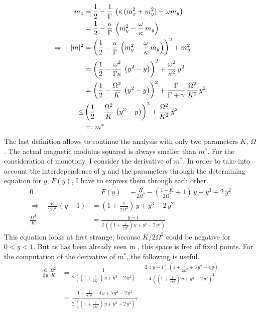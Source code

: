     \begin{align*}
        m_z&=\frac{1}{2}-\frac{1}{\Gamma}\,\left( \kappa\,(m_x^2+m_y^2)-\omega m_y  \right)\\
        &=\frac{1}{2}-\frac{\kappa}{\Gamma}\,\left( m_y^2-\frac{\omega}{\kappa}\, m_y  \right)\\
        \Rightarrow\quad |m|^2&=\left( \frac{1}{2}-\frac{\kappa}{\Gamma}\,\left( m_y^2-\frac{\omega}{\kappa}\, m_y  \right) \right)^2+m_y^2\\
        &=\left( \frac{1}{2}-\frac{\omega^2}{\Gamma\kappa}\,\left( {y}^2- {y} \right) \right)^2+\frac{\omega^2}{\kappa^2}\,{y}^2\\
        &=\left( \frac{1}{2}-\frac{\Omega^2}{K}\,\left( {y}^2- {y} \right) \right)^2+\frac{\Gamma}{\Gamma+\gamma}\,\frac{\Omega^2}{K^2}\,{y}^2\\
        \leq&\left( \frac{1}{2}-\frac{\Omega^2}{K}\,\left( {y}^2- {y} \right) \right)^2+\frac{\Omega^2}{K^2}\,{y}^2\\
        &=\vcentcolon m^*
    \end{align*}
    The last definition allows to continue the analysis with only two parameters $K$, $\Omega$. The actual magnetic modulus squared is always smaller than $m^*$. For the consideration of monotony, I consider the derivative of $m^*$. In order to take into account the interdependence of $y$ and the parameters through the determining equation for $y$, $F(y)$, I have to express them through each other. 
    \begin{align*}
        0&=F(y)=-\frac{K}{2\Omega^2}-\left( \frac{1-K}{2\Omega^2} +1\right)\,{y}-{y}^3+2\,{y}^2\\
        \Rightarrow\quad \frac{K}{2\Omega^2}\,({y}-1)&=(1+\frac{1}{2\Omega^2})\,{y}+{y}^3-2\,{y}^2\\
        \frac{\Omega^2}{K}&=\frac{{y}-1}{2\,\left(  (1+\frac{1}{2\Omega^2})\,{y}+{y}^3-2\,{y}^2\right)}
    \end{align*}
    This equation looks at first strange, because $K/2\Omega^2$ could be negative for $0<{y}<1$. But as has been already seen in , this space is free of fixed points. For the computation of the derivative of $m^*$, the following is useful. 
    \begin{align*}
        \frac{\text{d}}{\text{d}{y}}\,\frac{\Omega^2}{K}&=\frac{1}{2\,\left(  (1+\frac{1}{2\Omega^2})\,{y}+{y}^3-2\,{y}^2\right)}-\frac{2\,({y}-1)\,(1+\frac{1}{2\Omega^2}+3\,{y}^2-4\,{y})}{4\,\left(  (1+\frac{1}{2\Omega^2})\,{y}+{y}^3-2\,{y}^2\right)^2}\\\\
        &=\frac{1+\frac{1}{2\Omega^2}-4\,{y}+5\,{y}^2-2\,{y}^3}{2\,\left(  (1+\frac{1}{2\Omega^2})\,{y}+{y}^3-2\,{y}^2\right)^2}
    \end{align*}
